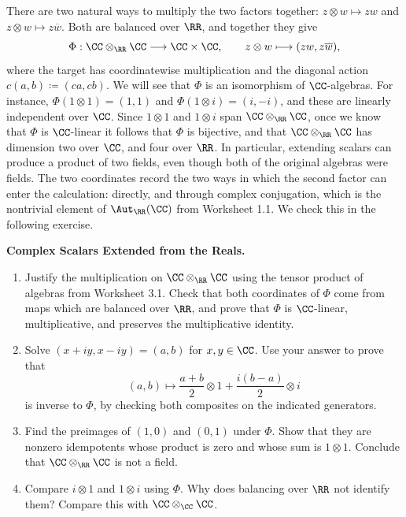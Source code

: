 \documentclass[12pt,reqno]{amsart}
\begin{document}
There are two natural ways to multiply the two factors together: $z\otimes w\mapsto zw$ and $z\otimes w\mapsto z\overline w$. Both are balanced over $\RR$, and together they give
\[
\Phi:\CC\otimes_{\RR}\CC\longrightarrow\CC\times\CC,\qquad z\otimes w\longmapsto(zw,z\overline w),
\]
where the target has coordinatewise multiplication and the diagonal action $c(a,b)\coloneqq(ca,cb)$. We will see that $\Phi$ is an isomorphism of $\CC$-algebras. For instance, $\Phi(1\otimes1)=(1,1)$ and $\Phi(1\otimes i)=(i,-i)$, and these are linearly independent over $\CC$. Since $1\otimes1$ and $1\otimes i$ span $\CC\otimes_{\RR}\CC$, once we know that $\Phi$ is $\CC$-linear it follows that $\Phi$ is bijective, and that $\CC\otimes_{\RR}\CC$ has dimension two over $\CC$, and four over $\RR$. In particular, extending scalars can produce a product of two fields, even though both of the original algebras were fields. The two coordinates record the two ways in which the second factor can enter the calculation: directly, and through complex conjugation, which is the nontrivial element of $\Aut_{\RR}(\CC)$ from Worksheet 1.1. We check this in the following exercise.

\hrulefill

\begin{problems}
\item\label{t:complex} \textbf{Complex Scalars Extended from the Reals.}
\begin{enumerate}
\item Justify the multiplication on $\CC\otimes_{\RR}\CC$ using the tensor product of algebras from Worksheet 3.1. Check that both coordinates of $\Phi$ come from maps which are balanced over $\RR$, and prove that $\Phi$ is $\CC$-linear, multiplicative, and preserves the multiplicative identity.
\item Solve $(x+iy,x-iy)=(a,b)$ for $x,y\in\CC$. Use your answer to prove that
\[
(a,b)\longmapsto\frac{a+b}{2}\otimes1+\frac{i(b-a)}{2}\otimes i
\]
is inverse to $\Phi$, by checking both composites on the indicated generators.
\item Find the preimages of $(1,0)$ and $(0,1)$ under $\Phi$. Show that they are nonzero idempotents whose product is zero and whose sum is $1\otimes1$. Conclude that $\CC\otimes_{\RR}\CC$ is not a field.
\item Compare $i\otimes1$ and $1\otimes i$ using $\Phi$. Why does balancing over $\RR$ not identify them? Compare this with $\CC\otimes_{\CC}\CC$.
\end{enumerate}
\end{problems}
\end{document}
